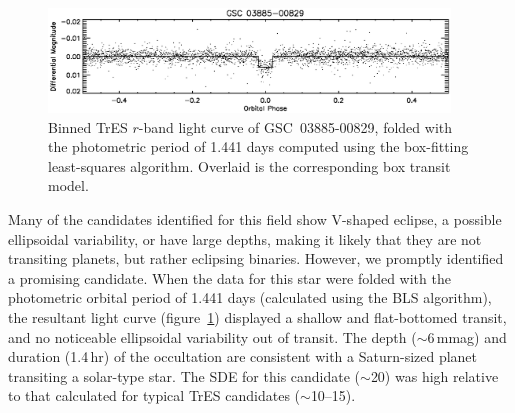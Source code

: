 \begin{figure}
\begin{center}
\includegraphics[width=0.95\textwidth]{3_f1}
\caption[TrES light curve of \mbox{GSC 03885-00829}, a blended eclipsing binary]{Binned TrES $r$-band light curve of \mbox{GSC 03885-00829},
  folded with the photometric period of 1.441 days computed using the
  box-fitting least-squares algorithm. Overlaid is the corresponding
  box transit model.}\label{cha:gsc:fig:discovery}
\end{center}
\end{figure}

Many of the candidates identified for this field show V-shaped
eclipse, a possible ellipsoidal variability, or have large depths,
making it likely that they are not transiting planets, but rather
eclipsing binaries.  However, we promptly identified a promising
candidate. When the data for this star were folded with the
photometric orbital period of 1.441 days (calculated using the BLS
algorithm), the resultant light curve (figure~\ref{cha:gsc:fig:discovery})
displayed a shallow and flat-bottomed transit, and no noticeable
ellipsoidal variability out of transit. The depth ($\sim$6\,mmag) and
duration (1.4\,hr) of the occultation are consistent with a
Saturn-sized planet transiting a solar-type star.  The SDE for this
candidate ($\sim$20) was high relative to that calculated for typical
TrES candidates ($\sim$10--15).

